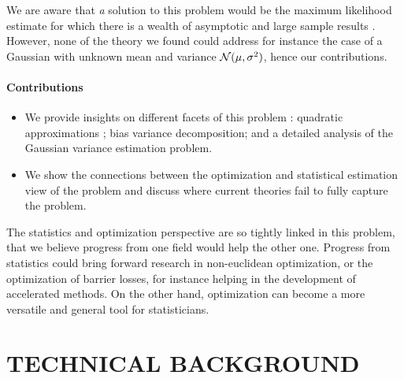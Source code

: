 \documentclass[twoside]{article}
\let\oldsection\section
\renewcommand{\section}[1]{\oldsection{\texorpdfstring{\uppercase{#1}}{#1}}}
\begin{document}
We are aware that \emph{a} solution to this problem would be the maximum likelihood estimate for which there is a wealth of asymptotic and large sample results \citep{van2000asymptotic,ostrovskii2021finite}. %
However, none of the theory we found could address for instance the case of a Gaussian with unknown mean and variance ${\mathcal N}(\mu,\sigma^2)$, hence our contributions. 

\paragraph{Contributions}
\begin{itemize}
	\item We provide insights on different facets of this problem : quadratic approximations ; bias variance decomposition; and a detailed analysis of the Gaussian variance estimation problem.
	\item We show the connections between the optimization and statistical estimation view of the problem and discuss where current theories fail to fully capture the problem.
\end{itemize}

The statistics and optimization perspective are so tightly linked in this problem, that we believe progress from one field would help the other one. 
Progress from statistics could bring forward research in non-euclidean optimization, or the optimization of barrier losses, for instance helping in the development of accelerated methods.
On the other hand, optimization can become  a more versatile and general tool for statisticians. %




\section{Technical background}
\end{document}
